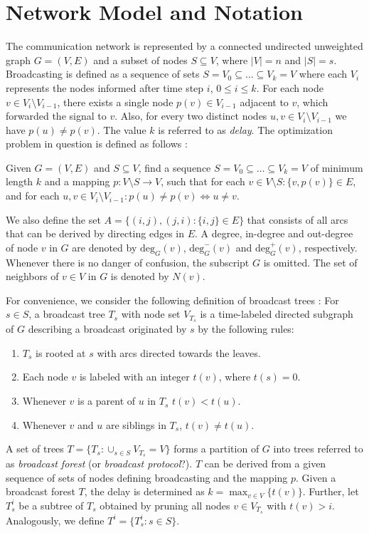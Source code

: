 \section{Network Model and Notation}

The communication network is represented by a connected undirected unweighted graph $G=(V,E)$ and a subset of nodes $S\subseteq V$, where $|V|=n$ and $|S|=s$. 
Broadcasting is defined as a sequence of sets $S=V_0\subseteq\dots\subseteq V_k = V$ where each $V_i$ represents the nodes informed after time step $i$, $0\leq i\leq k$.
For each node $v\in V_i\setminus V_{i-1}$, there exists a single node $p(v)\in V_{i-1}$ adjacent to $v$, which forwarded the signal to $v$.
Also, for every two distinct nodes $u,v\in V_i\setminus V_{i-1}$ we have $p(u)\neq p(v)$.
The value $k$ is referred to as \emph{delay}.
The optimization problem in question is defined as follows \cite{jansen95,middendorf93}:
\begin{problem}\label{prob:min}
Given $G=(V,E)$ and $S\subseteq V$, find a sequence $S=V_0\subseteq\dots\subseteq V_k=V$ of minimum length $k$ 
and a mapping $p:V\setminus S\to V$, such that for each $v\in V\setminus S:\{v,p(v)\}\in E$, and for each $u,v\in V_i\setminus V_{i-1}: p(u)\neq p(v)\Leftrightarrow u\neq v$.
\end{problem}
We also define the set $A=\{(i,j),(j,i):\{i,j\}\in E\}$ that consists of all arcs that can be derived by directing edges in $E$.
A degree, in-degree and out-degree of node $v$ in $G$ are denoted by $\text{deg}_G(v)$, $\text{deg}^-_G(v)$ and $\text{deg}^+_G(v)$, respectively.
Whenever there is no danger of confusion, the subscript $G$ is omitted.
The set of neighbors of $v\in V$ in $G$ is denoted by $N(v)$.

For convenience, we consider the following definition of broadcast trees \cite{grigni91}:
For $s\in S$, a broadcast tree $T_s$ with node set $V_{T_s}$ is a time-labeled directed subgraph of $G$ describing a broadcast originated by $s$ by the following rules:
\begin{enumerate}
\item $T_s$ is rooted at $s$ with arcs directed towards the leaves.
\item Each node $v$ is labeled with an integer $t(v)$, where $t(s)=0$.
\item Whenever $v$ is a parent of $u$ in $T_s$ $t(v)<t(u)$.
\item Whenever $v$ and $u$ are siblings in $T_s$, $t(v)\neq t(u)$. 
\end{enumerate}
A set of trees $T=\{T_s:\cup_{s\in S}V_{T_s}=V\}$ forms a partition of $G$ into trees referred to as \emph{broadcast forest} (or \emph{broadcast protocol}?).
$T$ can be derived from a given sequence of sets of nodes defining broadcasting and the mapping $p$.
Given a broadcast forest $T$, the delay is determined as $k=\max_{v\in V}\{t(v)\}$.
Further, let $T^i_s$ be a subtree of $T_s$ obtained by pruning all nodes $v\in V_{T_s}$ with $t(v)>i$.
Analogously, we define $T^i=\{T^i_s:s\in S\}$. 

